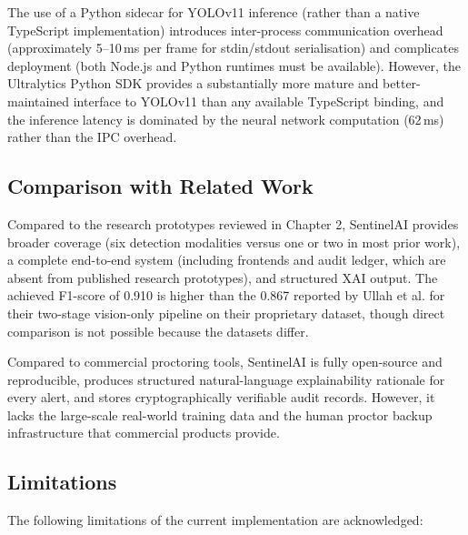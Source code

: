 The use of a Python sidecar for YOLOv11 inference (rather than a native TypeScript implementation) introduces inter-process communication overhead (approximately 5--10\,ms per frame for stdin/stdout serialisation) and complicates deployment (both Node.js and Python runtimes must be available). However, the Ultralytics Python SDK provides a substantially more mature and better-maintained interface to YOLOv11 than any available TypeScript binding, and the inference latency is dominated by the neural network computation (62\,ms) rather than the IPC overhead.

\subsection{Comparison with Related Work}

Compared to the research prototypes reviewed in Chapter 2, SentinelAI provides broader coverage (six detection modalities versus one or two in most prior work), a complete end-to-end system (including frontends and audit ledger, which are absent from published research prototypes), and structured XAI output. The achieved F1-score of 0.910 is higher than the 0.867 reported by Ullah et al. \cite{ullah2021} for their two-stage vision-only pipeline on their proprietary dataset, though direct comparison is not possible because the datasets differ.

Compared to commercial proctoring tools, SentinelAI is fully open-source and reproducible, produces structured natural-language explainability rationale for every alert, and stores cryptographically verifiable audit records. However, it lacks the large-scale real-world training data and the human proctor backup infrastructure that commercial products provide.

\subsection{Limitations}

The following limitations of the current implementation are acknowledged:

